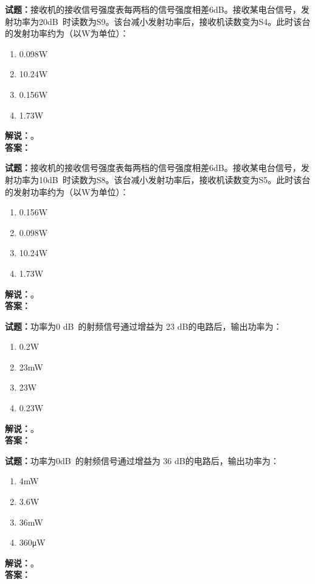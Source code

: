 \documentclass{ctexbook}
\begin{document}
\bigskip




\noindent\textbf{试题：}接收机的接收信号强度表每两档的信号强度相差6dB。接收某电台信号，发射功率为20\unit[qualifier-mode=combine]{\deci\bel{}}时读数为S9。该台减小发射功率后，接收机读数变为S4。此时该台的发射功率约为（以W为单位）：
\begin{enumerate}[leftmargin=3em]
\item 0.098W
\item 10.24W
\item 0.156W
\item 1.73W
\end{enumerate}
\noindent\textbf{解说：}\textbf{}。\\\noindent\textbf{答案：}

\bigskip




\noindent\textbf{试题：}接收机的接收信号强度表每两档的信号强度相差6dB。接收某电台信号，发射功率为10\unit[qualifier-mode=combine]{\deci\bel{}}时读数为S8。该台减小发射功率后，接收机读数变为S5。此时该台的发射功率约为（以W为单位）：
\begin{enumerate}[leftmargin=3em]
\item 0.156W
\item 0.098W
\item 10.24W
\item 1.73W
\end{enumerate}
\noindent\textbf{解说：}\textbf{}。\\\noindent\textbf{答案：}

\bigskip




\noindent\textbf{试题：}功率为0 \unit[qualifier-mode=combine]{\deci\bel{}}的射频信号通过增益为 23 dB的电路后，输出功率为：
\begin{enumerate}[leftmargin=3em]
\item 0.2W
\item 23mW
\item 23W
\item 0.23W
\end{enumerate}
\noindent\textbf{解说：}\textbf{}。\\\noindent\textbf{答案：}

\bigskip




\noindent\textbf{试题：}功率为0\unit[qualifier-mode=combine]{\deci\bel{}}的射频信号通过增益为 36 dB的电路后，输出功率为：
\begin{enumerate}[leftmargin=3em]
\item 4mW
\item 3.6W
\item 36mW
\item 360μW
\end{enumerate}
\noindent\textbf{解说：}\textbf{}。\\\noindent\textbf{答案：}
\end{document}
